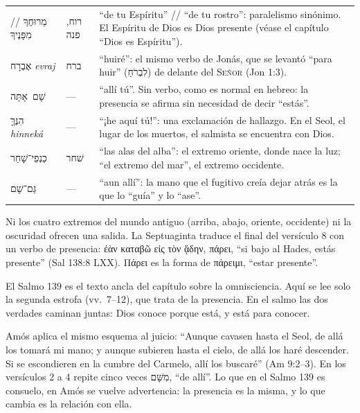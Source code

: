 \documentclass[11pt,letterpaper]{article}
\newcommand{\heb}[1]{\mbox{\foreignlanguage{hebrew}{#1}}}
\newcommand{\grc}[1]{\foreignlanguage{ancientgreek}{#1}}
\newcommand{\SENOR}{\textsc{Señor}}
\begin{document}
\begin{filologia}[Sal 139:7--12]
\begin{tabular}{@{}L{3.6cm}L{1.6cm}L{9.6cm}@{}}
\heb{מֵרוּחֶךָ} // \heb{מִפָּנֶיךָ} & \heb{רוח}, \heb{פנה} & ``de tu Espíritu'' // ``de tu rostro'': paralelismo sinónimo. El Espíritu de Dios es Dios presente (véase el capítulo ``Dios es Espíritu''). \\[2pt]
\heb{אֶבְרָח} \emph{evraj} & \heb{ברח} & ``huiré'': el mismo verbo de Jonás, que se levantó ``para huir'' (\heb{לִבְרֹחַ}) de delante del \SENOR{} (Jon 1:3). \\[2pt]
\heb{שָׁם אָתָּה} & --- & ``allí tú''. Sin verbo, como es normal en hebreo: la presencia se afirma sin necesidad de decir ``estás''. \\[2pt]
\heb{הִנֶּךָּ} \emph{hinneká} & --- & ``¡he aquí tú!'': una exclamación de hallazgo. En el Seol, el lugar de los muertos, el salmista se encuentra con Dios. \\[2pt]
\heb{כַנְפֵי־שָׁחַר} & \heb{שׁחר} & ``las alas del alba'': el extremo oriente, donde nace la luz; ``el extremo del mar'', el extremo occidente. \\[2pt]
\heb{גַּם־שָׁם} & --- & ``aun allí'': la mano que el fugitivo creía dejar atrás es la que lo ``guía'' y lo ``ase''. \\
\end{tabular}
\end{filologia}

Ni los cuatro extremos del mundo antiguo (arriba, abajo, oriente, occidente) ni la oscuridad ofrecen una salida. La Septuaginta traduce el final del versículo 8 con un verbo de presencia: \grc{ἐὰν καταβῶ εἰς τὸν ᾅδην, πάρει}, ``si bajo al Hades, estás presente'' (Sal 138:8 LXX). \grc{Πάρει} es la forma de \grc{πάρειμι}, ``estar presente''.

\begin{nota}[Precisión]
El Salmo 139 es el texto ancla del capítulo sobre la omnisciencia. Aquí se lee solo la segunda estrofa (vv.~7--12), que trata de la presencia. En el salmo las dos verdades caminan juntas: Dios conoce porque está, y está para conocer.
\end{nota}

Amós aplica el mismo esquema al juicio: ``Aunque cavasen hasta el Seol, de allá los tomará mi mano; y aunque subieren hasta el cielo, de allá los haré descender. Si se escondieren en la cumbre del Carmelo, allí los buscaré'' (Am 9:2--3). En los versículos 2 a 4 repite cinco veces \heb{מִשָּׁם}, ``de allí''. Lo que en el Salmo 139 es consuelo, en Amós se vuelve advertencia: la presencia es la misma, y lo que cambia es la relación con ella.
\end{document}
